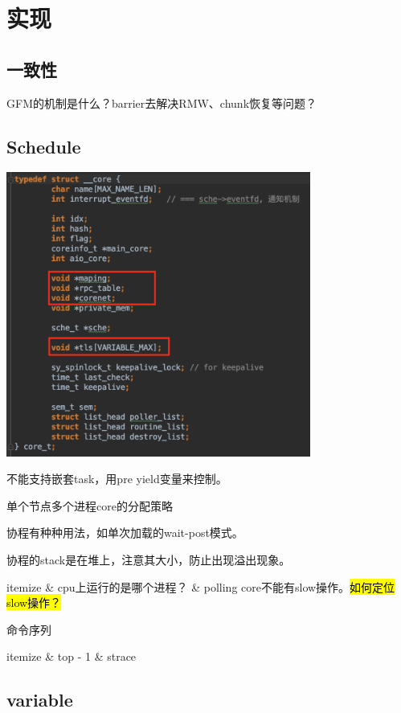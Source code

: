 \chapter{实现}

\section{一致性}

GFM的机制是什么？barrier去解决RMW、chunk恢复等问题？

\section{Schedule}

\begin{center}
\includegraphics[width=10cm]{../imgs/core-t.png}
\end{center}

不能支持嵌套task，用pre yield变量来控制。

单个节点多个进程core的分配策略

协程有种种用法，如单次加载的wait-post模式。

协程的stack是在堆上，注意其大小，防止出现溢出现象。

\begin{myeasylist}{itemize}
& cpu上运行的是哪个进程？
& polling core不能有slow操作。\hl{如何定位slow操作？}
\end{myeasylist}

命令序列
\begin{myeasylist}{itemize}
& top - 1
& strace
\end{myeasylist}

\section{variable}

